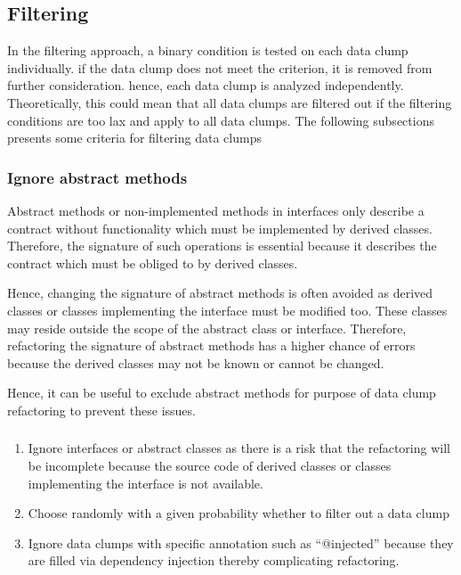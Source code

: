 \subsection{Filtering}
In the filtering approach, a binary condition is tested on each data clump individually. if the data clump does not meet the criterion, it is removed from further consideration. hence, each data clump is analyzed independently. Theoretically, this could mean that all data clumps are filtered out if the filtering conditions are too lax and apply to all data clumps. 
The following subsections presents some  criteria for filtering data clumps
\subsubsection{Ignore abstract methods}

Abstract methods or non-implemented methods in interfaces only describe a contract without functionality which must be implemented by derived classes. Therefore, the signature of such operations is essential because it describes the contract which must be obliged to by derived classes.

Hence, changing the signature of abstract methods is often avoided as derived classes or classes implementing the interface must be modified too. These classes may reside outside the scope of the abstract class or interface. Therefore, refactoring the signature of abstract methods has a higher chance of errors because the derived classes may not be known or cannot be changed. 

Hence, it can be useful to exclude abstract methods for purpose of data clump refactoring to prevent these issues. 

\subsubsection{}

\begin{enumerate}
    \item Ignore interfaces or abstract classes as there is a risk that the refactoring will be incomplete because the source code of derived classes or classes implementing the interface is not available. 

    \item Choose randomly with a given probability whether to filter out a data clump
    \item Ignore data clumps with specific annotation such as \enquote{@injected} because they are filled via dependency injection thereby complicating refactoring.
 
\end{enumerate}

